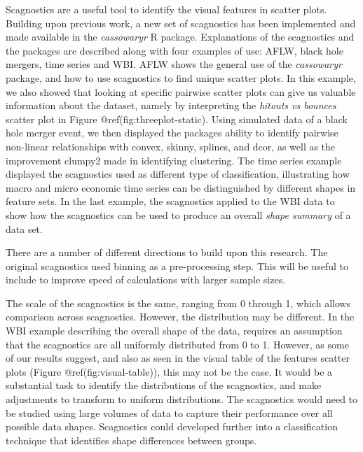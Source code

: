 Scagnostics are a useful tool to identify the visual features in scatter
plots. Building upon previous work, a new set of scagnostics has been
implemented and made available in the \emph{cassowaryr} R package.
Explanations of the scagnostics and the packages are described along
with four examples of use: AFLW, black hole mergers, time series and
WBI. AFLW shows the general use of the \emph{cassowaryr} package, and
how to use scagnostics to find unique scatter plots. In this example, we
also showed that looking at specific pairwise scatter plots can give us
valuable information about the dataset, namely by interpreting the
\emph{hitouts vs bounces} scatter plot in Figure
@ref(fig:threeplot-static). Using simulated data of a black hole merger
event, we then displayed the packages ability to identify pairwise
non-linear relationships with convex, skinny, splines, and dcor, as well
as the improvement clumpy2 made in identifying clustering. The time
series example displayed the scagnostics used as different type of
classification, illustrating how macro and micro economic time series
can be distinguished by different shapes in feature sets. In the last
example, the scagnostics applied to the WBI data to show how the
scagnostics can be used to produce an overall \emph{shape summary} of a
data set.

There are a number of different directions to build upon this research.
The original scagnostics used binning as a pre-processing step. This
will be useful to include to improve speed of calculations with larger
sample sizes.

The scale of the scagnostics is the same, ranging from 0 through 1,
which allows comparison across scagnostics. However, the distribution
may be different. In the WBI example describing the overall shape of the
data, requires an assumption that the scagnostics are all uniformly
distributed from 0 to 1. However, as some of our results suggest, and
also as seen in the visual table of the features scatter plots (Figure
@ref(fig:visual-table)), this may not be the case. It would be a
substantial task to identify the distributions of the scagnostics, and
make adjustments to transform to uniform distributions. The scagnostics
would need to be studied using large volumes of data to capture their
performance over all possible data shapes. Scagnostics could developed
further into a classification technique that identifies shape
differences between groups.


